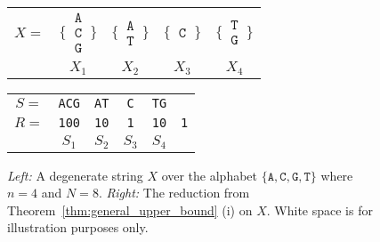 \begin{figure}[h!]
    \centering
    \begin{tabular}{c@{\hskip 0.5em}c@{\hskip 0.5em}c@{\hskip 0.5em}c@{\hskip 0.5em}c}
        $X = $                                                               & $\Bigg\{\,\begin{matrix}\texttt{A}\\\texttt{C}\\\texttt{G}\end{matrix}\,\Bigg\}$ &
        $\Bigg\{\,\begin{matrix}\texttt{A}\\\texttt{T}\end{matrix}\,\Bigg\}$ &
        $\Bigg\{\,\begin{matrix}\texttt{C}\end{matrix}\,\Bigg\}$             &
        $\Bigg\{\,\begin{matrix}\texttt{T}\\\texttt{G}\end{matrix}\,\Bigg\}$                                                                                                            \\
                                                                             & $X_1$                                                                            & $X_2$ & $X_3$ & $X_4$
    \end{tabular}\qquad\begin{tabular}{c@{\hskip 0.5em}c@{\hskip 0.5em}c@{\hskip 0.5em}c@{\hskip 0.5em}c@{\hskip 0.5em}c}
        $S =$  & \texttt{ACG} & \texttt{AT} & \texttt{C} & \texttt{TG} &            \\
        $R = $ & \texttt{100} & \texttt{10} & \texttt{1} & \texttt{10} & \texttt{1} \\
               & $S_1$        & $S_2$       & $S_3$      & $S_4$
    \end{tabular}
    \caption{\emph{Left:} A degenerate string $X$ over the alphabet $\{\texttt{A}, \texttt{C}, \texttt{G}, \texttt{T}\}$ where $n = 4$ and $N = 8$. \emph{Right:} The reduction from Theorem~\ref{thm:general_upper_bound} (i) on $X$. White space is for illustration purposes only. {\cite{bille2023rank}}}
    \label{fig:reduction_example}
\end{figure}

